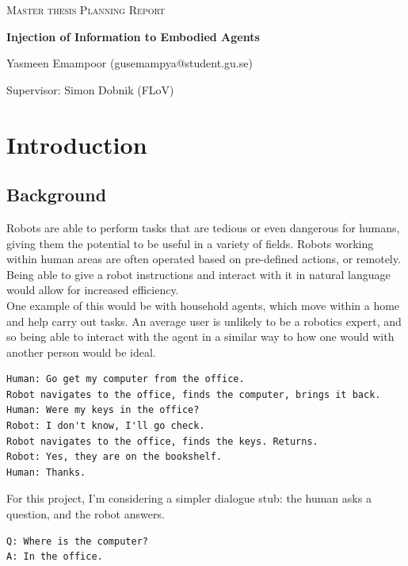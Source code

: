 \documentclass{article}
\begin{document}
\begin{titlepage}
  

\centering
  
  
{\scshape\LARGE Master thesis Planning Report\\}
  
\vspace{0.5cm}
  
{\huge\bfseries Injection of Information to Embodied Agents\\}

  
\vspace{2cm}
  
{\Large Yasmeen Emampoor (gusemampya@student.gu.se)\\}
  
\vspace{1.0cm}
  
{\large Supervisor: Simon Dobnik (FLoV)\\}
  
\vspace{1.5cm}

\end{titlepage}
  
\section{Introduction}
\subsection{Background}
Robots are able to perform tasks that are tedious or even dangerous for humans, giving them the potential to be useful in a variety of fields. Robots working within human areas are often operated based on pre-defined actions, or remotely. Being able to give a robot instructions and interact with it in natural language would allow for increased efficiency. \\
One example of this would be with household agents, which move within a home and help carry out tasks. An average user is unlikely to be a robotics expert, and so being able to interact with the agent in a similar way to how one would with another person would be ideal.

\begin{verbatim}
Human: Go get my computer from the office. 
Robot navigates to the office, finds the computer, brings it back. 
Human: Were my keys in the office?
Robot: I don't know, I'll go check. 
Robot navigates to the office, finds the keys. Returns.
Robot: Yes, they are on the bookshelf. 
Human: Thanks. 
\end{verbatim}
For this project, I'm considering a simpler dialogue stub: the human asks a question, and the robot answers. 
\begin{verbatim}
Q: Where is the computer?
A: In the office. 
\end{verbatim}
\end{document}
